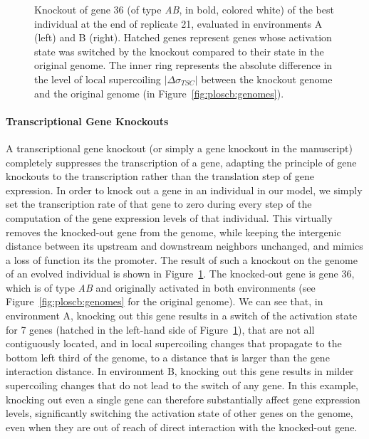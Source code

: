 \begin{figure}[H]
  \centering
  \begin{elasticrow}[width=\linewidth]
	\end{elasticrow}
  \caption[Example evolved individual with a knocked-out gene, evaluated in both environments]{Knockout of gene 36 (of type \emph{AB}, in bold, colored white) of the best individual at the end of replicate 21, evaluated in environments A (left) and B (right).
  Hatched genes represent genes whose activation state was switched by the knockout compared to their state in the original genome.
  The inner ring represents the absolute difference in the level of local supercoiling $|\Delta\sigma_{TSC}|$ between the knockout genome and the original genome (in Figure~\ref{fig:ploscb:genomes}).}
  \label{fig:ploscb:ko_genomes}
\end{figure}

\paragraph{Transcriptional Gene Knockouts}
A transcriptional gene knockout (or simply a gene knockout in the manuscript) completely suppresses the transcription of a gene, adapting the principle of gene knockouts to the transcription rather than the translation step of gene expression.
In order to knock out a gene in an individual in our model, we simply set the transcription rate of that gene to zero during every step of the computation of the gene expression levels of that individual.
This virtually removes the knocked-out gene from the genome, while keeping the intergenic distance between its upstream and downstream neighbors unchanged, and mimics a loss of function its the promoter.
The result of such a knockout on the genome of an evolved individual is shown in Figure~\ref{fig:ploscb:ko_genomes}.
The knocked-out gene is gene 36, which is of type \emph{AB} and originally activated in both environments (see Figure~\ref{fig:ploscb:genomes} for the original genome).
We can see that, in environment A, knocking out this gene results in a switch of the activation state for 7 genes (hatched in the left-hand side of Figure~\ref{fig:ploscb:ko_genomes}), that are not all contiguously located, and in local supercoiling changes that propagate to the bottom left third of the genome, to a distance that is larger than the gene interaction distance.
In environment B, knocking out this gene results in milder supercoiling changes that do not lead to the switch of any gene.
In this example, knocking out even a single gene can therefore substantially affect gene expression levels, significantly switching the activation state of other genes on the genome, even when they are out of reach of direct interaction with the knocked-out gene.

